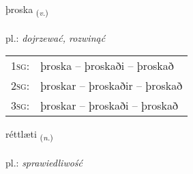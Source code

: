 \documentclass[frontgrid, backgrid]{flacards}\usepackage[]{graphicx}\usepackage[]{xcolor}
\begin{document}
\renewcommand{\flhead}{\vskip5pt \fboxsep=0pt {\small\bfseries\footnotesize Sagnorð | czasownik}}
\renewcommand{\fcfoot}{\vskip5pt \fboxsep=0pt \hspace{2pt}{\small\bfseries\footnotesize 3K}}

\renewcommand{\blhead}{\vskip5pt {\small\bfseries\footnotesize Sagnorð | czasownik }}
\renewcommand{\bcfoot}{\vskip5pt \hspace{2pt}{\small\bfseries\footnotesize 3K}}


{þroska \small{\textsubscript{(\textit{v.})}} \\[1ex] %
\textphonetic{[θrɔska]} \\
pl.: \emph{dojrzewać, rozwinąć} \\  [2ex]
\renewcommand*{\arraystretch}{0.8}
\begin{tabular}{p{1cm}l}
\textsc{1sg}: & þroska -- þroskaði -- þroskað \\ 
\textsc{2sg}: & þroskar -- þroskaðir -- þroskað \\ 
\textsc{3sg}: & þroskar -- þroskaði -- þroskað \\ 
\end{tabular}
}

\renewcommand{\flhead}{\vskip5pt \fboxsep=0pt {\small\bfseries\footnotesize Nafnorð | rzeczownik}}
\renewcommand{\fcfoot}{\vskip5pt \fboxsep=0pt \hspace{2pt}{\small\bfseries\footnotesize 3K}}

\renewcommand{\blhead}{\vskip5pt {\small\bfseries\footnotesize Nafnorð | rzeczownik }}
\renewcommand{\bcfoot}{\vskip5pt \hspace{2pt}{\small\bfseries\footnotesize 3K}}


{réttlæti \small{\textsubscript{(\textit{n.})}} \\[1ex] %
\textphonetic{[rjɛhtlaitɪ]} \\
pl.: \emph{sprawiedliwość} \\  [2ex]
\renewcommand*{\arraystretch}{0.8}
}
\end{document}
